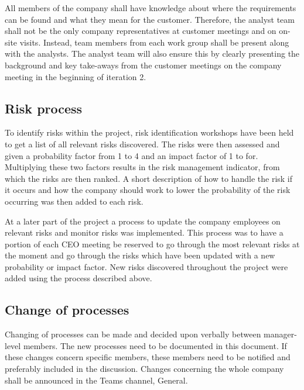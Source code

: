 All members of the company shall have knowledge about where the requirements can be found and what they mean for the customer. Therefore, the analyst team shall not be the only company representatives at customer meetings and on on-site visits. Instead, team members from each work group shall be present along with the analysts. The analyst team will also ensure this by clearly presenting the background and key take-aways from the customer meetings on the company meeting in the beginning of iteration 2. 

\subsection{Risk process}
To identify risks within the project, risk identification workshops have been held to get a list of all relevant risks discovered. The risks were then assessed and given a probability factor from 1 to 4 and an impact factor of 1 to for. Multiplying these two factors results in the risk management indicator, from which the risks are then ranked. A short description of how to handle the risk if it occurs and how the company should work to lower the probability of the risk occurring was then added to each risk. 

At a later part of the project a process to update the company employees on relevant risks and monitor risks was implemented. This process was to have a portion of each CEO meeting be reserved to go through the most relevant risks at the moment and go through the risks which have been updated with a new probability or impact factor. New risks discovered throughout the project were added using the process described above.


\subsection{Change of processes}
Changing of processes can be made and decided upon verbally between manager-level members. The new processes need to be documented in this document. If these changes concern specific members, these members need to be notified and preferably included in the discussion. Changes concerning the whole company shall be announced in the Teams channel, General.